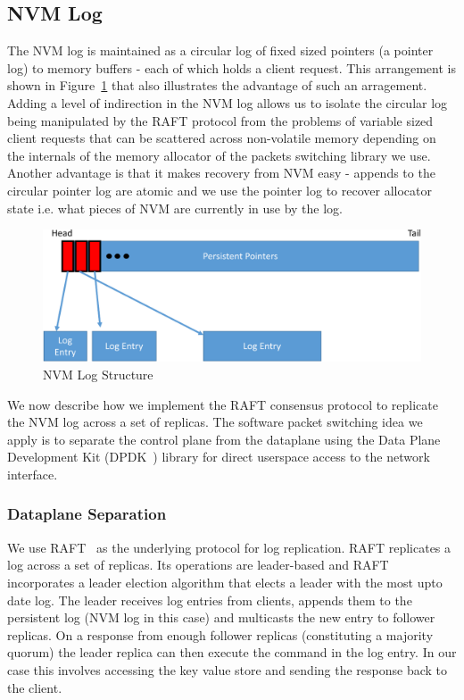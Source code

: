 \documentclass[10pt, preprint, nonatbib]{sigplanconf}
\begin{document}
\subsection{NVM Log}
The NVM log is maintained as a circular log of fixed sized pointers (a pointer
log) to memory buffers - each of which holds a client request. This arrangement
is shown in Figure~\ref{fig:nvm_log} that also illustrates the advantage of
such an arragement. Adding a level of indirection in the NVM log allows us to
isolate the circular log being manipulated by the RAFT protocol from the
problems of variable sized client requests that can be scattered across
non-volatile memory depending on the internals of the memory allocator of the
packets switching library we use. Another advantage is that it makes recovery
from NVM easy - appends to the circular pointer log are atomic and we use the
pointer log to recover allocator state i.e. what pieces of NVM are currently in
use by the log.

\begin{figure}
\centering
\includegraphics[scale=0.3]{figures2/nvm_log.pdf}
\caption{NVM Log Structure}
\label{fig:nvm_log}
\end{figure}

We now describe how we implement the RAFT consensus protocol to replicate the
NVM log across a set of replicas. The software packet switching idea we apply is
to separate the control plane from the dataplane using the Data Plane
Development Kit (DPDK~\cite{dpdk}) library for direct userspace access to the
network interface.

\subsubsection{Dataplane Separation}
We use RAFT~\cite{raft} as the underlying protocol for log replication. RAFT
replicates a log across a set of replicas. Its operations are leader-based and
RAFT incorporates a leader election algorithm that elects a leader with the most
upto date log. The leader receives log entries from clients, appends them to the
persistent log (NVM log in this case) and multicasts the new entry to follower
replicas. On a response from enough follower replicas (constituting a majority
quorum) the leader replica can then execute the command in the log entry. In
our case this involves accessing the key value store and sending the response
back to the client.
\end{document}
